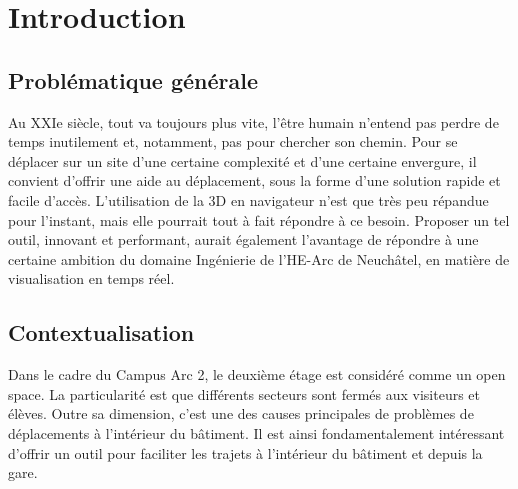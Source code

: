 \chapter{Introduction}

\section{Problématique générale}
Au XXIe siècle, tout va toujours plus vite, l'être humain n'entend pas perdre de temps inutilement et, notamment, pas pour chercher son chemin. Pour se déplacer sur un site d'une certaine complexité et d'une certaine envergure, il convient d'offrir une aide au déplacement, sous la forme d'une solution rapide et facile d'accès. L'utilisation de la 3D en navigateur n'est que très peu répandue pour l'instant, mais elle pourrait tout à fait répondre à ce besoin. Proposer un tel outil, innovant et performant, aurait également l'avantage de répondre à une certaine ambition du domaine Ingénierie de l'HE-Arc de Neuchâtel, en matière de visualisation en temps réel.   


\section{Contextualisation}
Dans le cadre du Campus Arc 2, le deuxième étage est considéré comme un open space. La particularité est que différents secteurs sont fermés aux visiteurs et élèves. Outre sa dimension, c'est une des causes principales de problèmes de déplacements à l'intérieur du bâtiment. Il est ainsi fondamentalement intéressant d'offrir un outil pour faciliter les trajets à l'intérieur du bâtiment et depuis la gare.